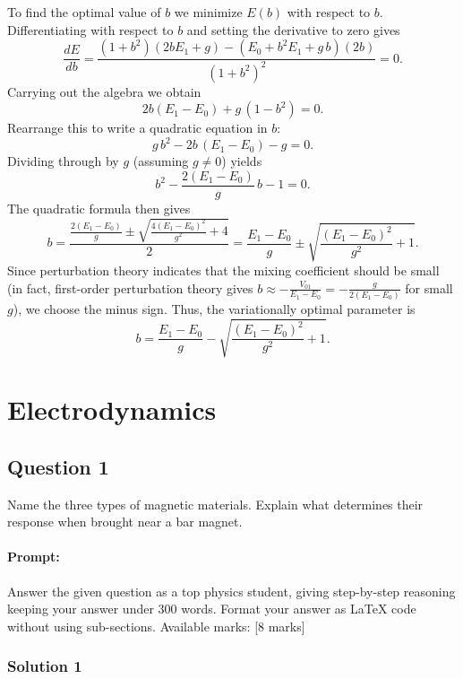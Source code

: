 \documentclass{article}
\begin{document}
To find the optimal value of \(b\) we minimize \(E(b)\) with respect to \(b\). Differentiating with respect to \(b\) and setting the derivative to zero gives
\[
\frac{dE}{db} = \frac{(1+b^2)(2bE_1+g) - (E_0 + b^2E_1 + g\,b)(2b)}{(1+b^2)^2} = 0.
\]
Carrying out the algebra we obtain
\[
2b(E_1-E_0) + g\,(1-b^2) = 0.
\]
Rearrange this to write a quadratic equation in \(b\):
\[
g\,b^2 - 2b\,(E_1-E_0) - g = 0.
\]
Dividing through by \(g\) (assuming \(g\ne0\)) yields
\[
b^2 - \frac{2(E_1-E_0)}{g}\,b - 1 = 0.
\]
The quadratic formula then gives
\[
b = \frac{\frac{2(E_1-E_0)}{g} \pm \sqrt{\frac{4(E_1-E_0)^2}{g^2}+4}}{2}
=\frac{E_1-E_0}{g} \pm \sqrt{\frac{(E_1-E_0)^2}{g^2}+1}.
\]
Since perturbation theory indicates that the mixing coefficient should be small (in fact, first-order perturbation theory gives \(b\approx -\frac{V_{01}}{E_1-E_0}=-\frac{g}{2(E_1-E_0)}\) for small \(g\)), we choose the minus sign. Thus, the variationally optimal parameter is
\[
b = \frac{E_1-E_0}{g} - \sqrt{\frac{(E_1-E_0)^2}{g^2}+1}.
\]



\section{Electrodynamics}


\subsection{Question 1}

Name the three types of magnetic materials. Explain what determines their response when brought near a bar magnet. 

\paragraph{Prompt: \\} 
Answer the given question as a top physics student, giving step-by-step reasoning keeping your answer under 300 words. Format your answer as LaTeX code without using sub-sections. Available marks: [8 marks]

\subsubsection{Solution 1}
\end{document}
